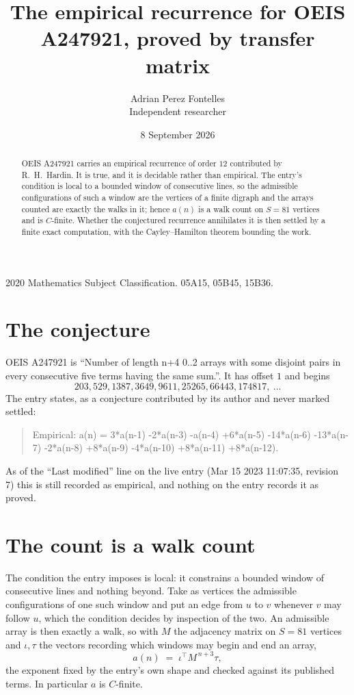 \documentclass[11pt,a4paper]{article}
\title{The empirical recurrence for OEIS A247921, proved by transfer matrix}
\author{Adrian Perez Fontelles\\ \small Independent researcher}
\date{8 September 2026}
\theoremstyle{plain}
\theoremstyle{definition}
\begin{document}
\maketitle

\begin{abstract}
OEIS A247921 carries an empirical recurrence of order $12$ contributed by R.~H.~Hardin. It is
true, and it is decidable rather than empirical. The entry's condition is local to a bounded window of consecutive lines, so
the admissible configurations of such a window are the vertices of a finite digraph and the
arrays counted are exactly the walks in it; hence $a(n)$ is a walk count on $S=81$ vertices
and is $C$-finite. Whether the conjectured recurrence annihilates it is then settled by a
finite exact computation, with the Cayley--Hamilton theorem bounding the work.
\end{abstract}

\noindent\small 2020 Mathematics Subject Classification. 05A15, 05B45, 15B36.\normalsize

\section{The conjecture}

OEIS A247921 is ``Number of length n+4 0..2 arrays with some disjoint pairs in every consecutive five terms having the same sum.''. It has offset $1$ and begins
\[
203, 529, 1387, 3649, 9611, 25265, 66443, 174817,\ \dots
\]
The entry states, as a conjecture contributed by its author and never marked settled:
\begin{quote}
Empirical: a(n) = 3*a(n-1) -2*a(n-3) -a(n-4) +6*a(n-5) -14*a(n-6) -13*a(n-7) -2*a(n-8) +8*a(n-9) -4*a(n-10) +8*a(n-11) +8*a(n-12).
\end{quote}
As of the ``Last modified'' line on the live entry (Mar 15 2023 11:07:35, revision 7) this is still
recorded as empirical, and nothing on the entry records it as proved.

\section{The count is a walk count}

The condition the entry imposes is local: it constrains a bounded window of consecutive lines and nothing beyond. Take as
vertices the admissible configurations of one such window and put an edge from $u$ to $v$
whenever $v$ may follow $u$, which the condition decides by inspection of the two. An
admissible array is then exactly a walk, so with $M$ the adjacency matrix on $S=81$ vertices
and $\iota,\tau$ the vectors recording which windows may begin and end an array,
\[
a(n)\;=\;\iota^{\!\top}M^{\,n+3}\tau ,
\]
the exponent fixed by the entry's own shape and checked against its published terms. In
particular $a$ is $C$-finite.
\end{document}
